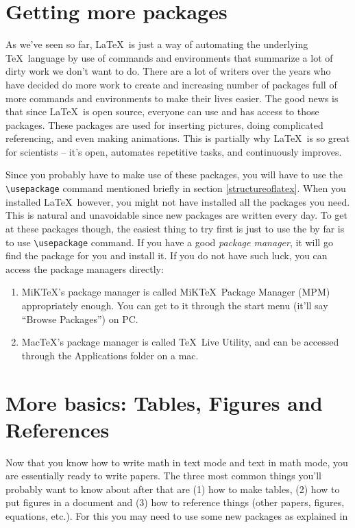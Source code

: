 \section{Getting more packages}\label{packagemanagers}

As we've seen so far, \LaTeX\ is just a way of automating the underlying \TeX\ language by use of commands and environments that summarize a lot of dirty work we don't want to do. There are a lot of writers over the years who have decided do more work to create and increasing number of packages full of more commands and environments to make their lives easier. The good news is that since \LaTeX\ is open source, everyone can use and has access to those packages. These packages are used for inserting pictures, doing complicated referencing, and even making animations. This is partially why \LaTeX\ is so great for scientists -- it's open, automates repetitive tasks, and continuously improves.

Since you probably have to make use of these packages, you will have to use the \verb|\usepackage| command mentioned briefly in section \ref{structureoflatex}. When you installed \LaTeX\ however, you might not have installed all the packages you need. This is natural and unavoidable since new packages are written every day. To get at these packages though, the easiest thing to try first is just to use the by far is to use  \verb|\usepackage| command. If you have a good \emph{package manager}, it will go find the package for you and install it. If you do not have such luck, you can access the package managers directly: 
\begin{enumerate}
\item MiK\TeX 's package manager is called MiK\TeX\ Package Manager (MPM) appropriately enough. You can get to it through the start menu (it'll say ``Browse Packages'') on PC.
\item Mac\TeX 's package manager is called \TeX\ Live Utility, and can be accessed through the Applications folder on a mac.
\end{enumerate} 


\section{More basics: Tables, Figures and References}
Now that you know how to write math in text mode and text in math mode, you are essentially ready to write papers. The three most common things you'll probably want to know about after that are (1) how to make tables, (2) how to put figures in a document and (3) how to reference things (other papers, figures, equations, etc.).  For this you may need to use some new packages as explained in 

